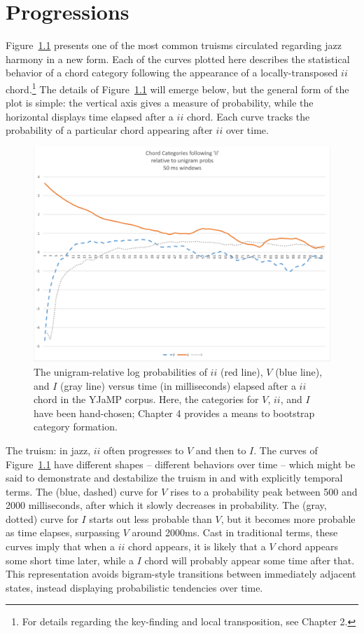 \chapter{Progressions}

Figure~\ref{iiprog} presents one of the most common truisms circulated regarding jazz harmony in a new form.  Each of the curves plotted here describes the statistical behavior of a chord category following the appearance of a locally-transposed $ii$ chord.\footnote{For details regarding the key-finding and local transposition, see Chapter 2.}  The details of Figure~\ref{iiprog} will emerge below, but the general form of the plot is simple: the vertical axis gives a measure of probability, while the horizontal displays time elapsed after a $ii$ chord.  Each curve tracks the probability of a particular chord appearing after $ii$ over time.

\begin{figure}
	\centering
	\includegraphics[width=5.8in]{iiprogressions.png}
	\caption{The unigram-relative log probabilities of $ii$ (red line), $V$ (blue line), and $I$ (gray line) versus time (in milliseconds) elapsed after a $ii$ chord in the YJaMP corpus.  Here, the categories for $V$, $ii$, and $I$ have been hand-chosen; Chapter 4 provides a means to bootstrap category formation.}
	\label{iiprog}
\end{figure}

The truism: in jazz, $ii$ often progresses to $V$ and then to $I$.  The curves of Figure~\ref{iiprog} have different shapes -- different behaviors over time -- which might be said to demonstrate and destabilize the truism in and with explicitly temporal terms.  The (blue, dashed) curve for $V$ rises to a probability peak between 500 and 2000 milliseconds, after which it slowly decreases in probability.  The (gray, dotted) curve for $I$ starts out less probable than $V$, but it becomes more probable as time elapses, surpassing $V$ around 2000ms.  Cast in traditional terms, these curves imply that when a $ii$ chord appears, it is likely that a $V$ chord appears some short time later, while a $I$ chord will probably appear some time after that.  This representation avoids bigram-style transitions between immediately adjacent states, instead displaying probabilistic tendencies over time.

